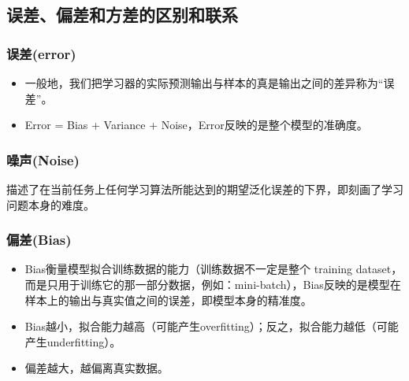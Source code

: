\documentclass[UTF8]{ctexart}
\begin{document}
\subsection{误差、偏差和方差的区别和联系}
\subsubsection{误差(error)}
\begin{itemize}
	\item 一般地，我们把学习器的实际预测输出与样本的真是输出之间的差异称为“误差”。
	\item Error = Bias + Variance + Noise，Error反映的是整个模型的准确度。
\end{itemize}
\subsubsection{噪声(Noise)}
描述了在当前任务上任何学习算法所能达到的期望泛化误差的下界，即刻画了学习问题本身的难度。
\subsubsection{偏差(Bias)}
\begin{itemize}
	\item Bias衡量模型拟合训练数据的能力（训练数据不一定是整个 training dataset，而是只用于训练它的那一部分数据，例如：mini-batch），Bias反映的是模型在样本上的输出与真实值之间的误差，即模型本身的精准度。
	\item Bias越小，拟合能力越高（可能产生overfitting）；反之，拟合能力越低（可能产生underfitting）。
	\item 偏差越大，越偏离真实数据。
\end{itemize}
\end{document}
